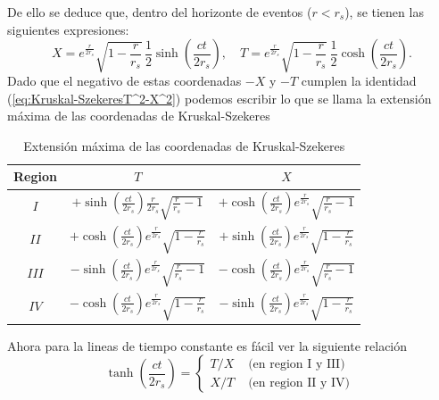 De ello se deduce que, dentro del horizonte de eventos (\(r < r_s\)), se tienen las siguientes expresiones:
\begin{equation}
    X = e^{\frac{r}{2r_s}} \sqrt{1-\frac{r}{r_s}} \, \frac{1}{2} \sinh\left(\frac{ct}{2r_s}\right), \quad 
    T = e^{\frac{r}{2r_s}} \sqrt{1-\frac{r}{r_s}} \, \frac{1}{2} \cosh\left(\frac{ct}{2r_s}\right).
\end{equation}
Dado que el negativo de estas coordenadas $-X$ y $-T$ cumplen la identidad (\ref{eq:Kruskal-SzekeresT^2-X^2}) podemos escribir lo que se llama la extensión máxima de las coordenadas de Kruskal-Szekeres
\begin{table}[H]
    \centering
    \caption{Extensión máxima de las coordenadas de Kruskal-Szekeres}
    \begin{tabular}{|c|c|c|}
        \hline Region & $T$                                                                                         & $X$                                                                                \\
        \hline$I$        & $+\sinh \left(\frac{c t}{2 r_s}\right)\frac{r}{2 r_s} \sqrt{\frac{r}{r_s}-1}$ & $+\cosh \left(\frac{c t}{2 r_s}\right) e^{\frac{r}{2 r_s}} \sqrt{\frac{r}{r_s}-1}$ \\
        \hline$I I$       & $+\cosh \left(\frac{c t}{2 r_s}\right) e^{\frac{r}{2 r_s}} \sqrt{1-\frac{r}{r_s}}$          & $+\sinh \left(\frac{c t}{2 r_s}\right) e^{\frac{r}{2 r_s}} \sqrt{1-\frac{r}{r_s}}$ \\
        \hline$I I I$   & $-\sinh \left(\frac{c t}{2 r_s}\right) e^{\frac{r}{2 r_s}} \sqrt{\frac{r}{r_s}-1}$          & $-\cosh \left(\frac{c t}{2 r_s}\right) e^{\frac{r}{2 r_s}} \sqrt{\frac{r}{r_s}-1}$ \\
        \hline$I V$      & $-\cosh \left(\frac{c t}{2 r_s}\right) e^{\frac{r}{2 r_s}} \sqrt{1-\frac{r}{r_s}}$          & $-\sinh \left(\frac{c t}{2 r_s}\right) e^{\frac{r}{2 r_s}} \sqrt{1-\frac{r}{r_s}}$ \\
        \hline
    \end{tabular}
\end{table}
Ahora para la lineas de tiempo constante es fácil ver la siguiente relación
\begin{equation}
    \tanh \left(\frac{ct}{2 r_s}\right)=\left\{\begin{array}{ll}
        T / X & \text { (en region I y III) } \\
        X / T & \text { (en region II y IV) }
        \end{array}\right.
\end{equation}
